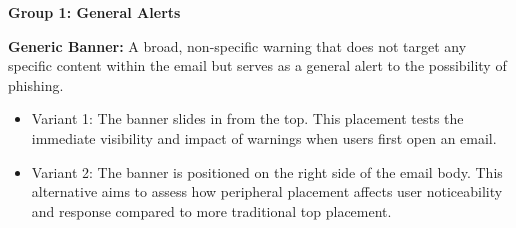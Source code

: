 \documentclass[
  a4paper,  %
  twoside,  %
  bibliography=totoc,
  headsepline,
  cleardoublepage=empty,
  parskip=half,
  draft=false
]{scrbook}
\begin{document}
\textbf{Group 1: General Alerts}

\textbf{Generic Banner:} A broad, non-specific warning that does not target any specific content within the email but serves as a general alert to the possibility of phishing.

\begin{itemize}
    \item Variant 1: The banner slides in from the top. This placement tests the immediate visibility and impact of warnings when users first open an email. 
    \item Variant 2: The banner is positioned on the right side of the email body. This alternative aims to assess how peripheral placement affects user noticeability and response compared to more traditional top placement.\par
\end{itemize}
\end{document}

